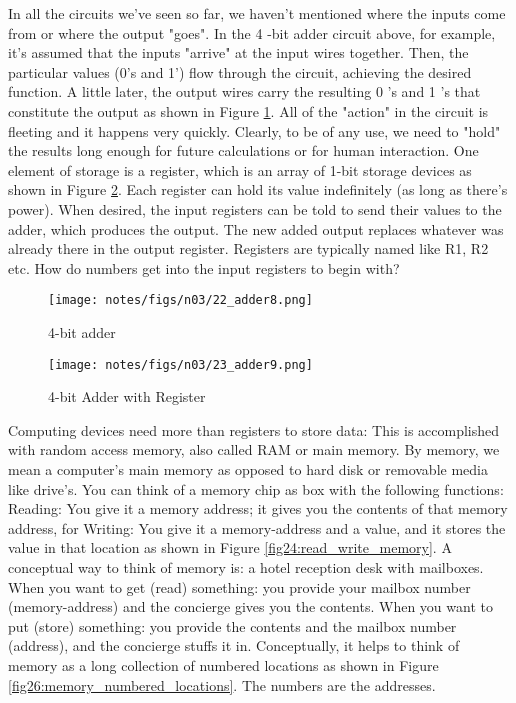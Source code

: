 \documentclass[main.tex]{subfiles}
\begin{document}
In all the circuits we've seen so far, we haven't mentioned where the inputs come from or where the output "goes". In the 4 -bit adder circuit above, for example, it's assumed that the inputs "arrive" at the input wires together. Then, the particular values (0's and 1') flow through the circuit, achieving the desired function. A little later, the output wires carry the resulting 0 's and 1 's that constitute the output as shown in Figure \ref{fig22:4-bit_adder}. All of the "action" in the circuit is fleeting and it happens very quickly. Clearly, to be of any use, we need to "hold" the results long enough for future calculations or for human interaction. One element of storage is a register, which is an array of 1-bit storage devices as shown in Figure \ref{fig23:4-bit_adder_with_register}. Each register can hold its value indefinitely (as long as there's power). When desired, the input registers can be told to send their values to the adder, which produces the output. The new added output replaces whatever was already there in the output register. Registers are typically named like R1, R2 etc. How do numbers get into the input registers to begin with? \\

\begin{figure}
    \centering
    \texttt{[image: notes/figs/n03/22\_adder8.png]}
    \caption{4-bit adder}
    \label{fig22:4-bit_adder}
\end{figure}

\begin{figure}
    \centering
    \texttt{[image: notes/figs/n03/23\_adder9.png]}
    \caption{4-bit Adder with Register}
    \label{fig23:4-bit_adder_with_register}
\end{figure}

Computing devices need more than registers to store data: This is accomplished with random access memory, also called RAM or main memory. By memory, we mean a computer's main memory as opposed to hard disk or removable media like drive's. You can think of a memory chip as box with the following functions: Reading: You give it a memory address; it gives you the contents of that memory address, for Writing: You give it a memory-address and a value, and it stores the value in that location as shown in Figure \ref{fig24:read_write_memory}. A conceptual way to think of memory is: a hotel reception desk with mailboxes. When you want to get (read) something: you provide your mailbox number (memory-address) and the concierge gives you the contents. When you want to put (store) something: you provide the contents and the mailbox number (address), and the concierge stuffs it in. Conceptually, it helps to think of memory as a long collection of numbered locations as shown in Figure \ref{fig26:memory_numbered_locations}. The numbers are the addresses.
\end{document}
